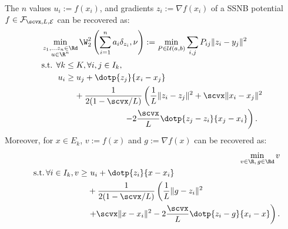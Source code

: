 \begin{theorem}\label{thm:regasreg:optpb}
 The $n$ values $u_i:=f(x_i)$, and gradients $z_i:=\nabla f(x_i)$ of a SSNB potential $f\in\mathcal{F}_{\scvx, L,\mathcal{E}}$ can be recovered as:
 \begin{align} \label{eqn:SSNB}
     &\min_{\substack{z_1, \ldots z_n \in \Rd\\u \in \R^n}} \W_2^2 \left( \sum_{i=1}^n a_i \delta_{z_i}, \nu \right) := \min_{P\in\mathcal{U}(a,b)} \sum_{i,j} P_{ij} \|z_i - y_j\|^2\\
     &\textrm{s.t. } \forall k\leq K, \forall i,j\in I_k, \nonumber\\
     & \qquad u_i \geq u_j + \dotp{z_j}{x_i - x_j} \nonumber\\
     &\qquad \qquad + \frac{1}{2(1 - \scvx/L)} \left(
             \frac{1}{L} \|z_i - z_j\|^2 + \scvx\|x_i - x_j\|^2 \right. \nonumber \\
     &\qquad \qquad \qquad \qquad \qquad
             \left. - 2\frac{\scvx}{L} \dotp{z_j - z_i}{x_j - x_i}
         \right).\nonumber
 \end{align}
 Moreover, for $x \in E_k$, $v := f(x)$ and $g := \nabla f(x)$ can be recovered as:
 \begin{align}\label{eqn:newpoint}
     \min_{v \in \R,\, g \in \Rd} v \\
     \begin{split}
         \mathrm{\quad s.t.} \, \forall i \in I_k, v \geq & \text{ } u_i + \dotp{z_i}{x - x_i} \\
         &+ \frac{1}{2(1-\scvx/L)} \left(
             \frac{1}{L} \|g - z_i\|^2 \right.\\
         &\left. + \scvx \|x - x_i\|^2 - 2 \frac{\scvx}{L} \dotp{z_i - g}{x_i - x}
         \right).
    \end{split} \nonumber
\end{align}
\end{theorem}

